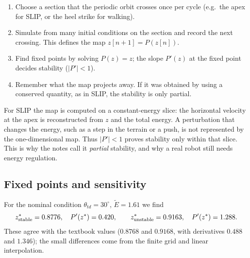 \documentclass[11pt]{article}
\begin{document}
\begin{recipe}[breakable=false,title={How to build and read a Poincar\'e map}]
\begin{enumerate}[leftmargin=1.4em,itemsep=2pt]
  \item Choose a section that the periodic orbit crosses once per cycle
        (e.g.\ the apex for SLIP, or the heel strike for walking).
  \item Simulate from many initial conditions on the section and record the
        next crossing.  This defines the map $z[n+1]=P(z[n])$.
  \item Find fixed points by solving $P(z)=z$; the slope $P'(z)$ at the fixed
        point decides stability ($|P'|<1$).
  \item Remember what the map projects away.  If it was obtained by using a
        conserved quantity, as in SLIP, the stability is only partial.
\end{enumerate}
\end{recipe}

\begin{pitfall}[breakable=false,title={A stable apex map is not full stability}]
For SLIP the map is computed on a constant-energy slice: the horizontal
velocity at the apex is reconstructed from $z$ and the total energy.  A
perturbation that changes the energy, such as a step in the terrain or a push,
is not represented by the one-dimensional map.  Thus $|P'|<1$ proves
stability only within that slice.  This is why the notes call it
\emph{partial} stability, and why a real robot still needs energy regulation.
\end{pitfall}

\subsection{Fixed points and sensitivity}

For the nominal condition $\theta_{td}=30^\circ$, $\tilde E=1.61$ we find
\begin{equation}
z^*_{\rm stable}=0.8776,\quad P'(z^*)=0.420,
\qquad
z^*_{\rm unstable}=0.9163,\quad P'(z^*)=1.288 .
\end{equation}
These agree with the textbook values ($0.8768$ and $0.9168$, with derivatives
$0.488$ and $1.346$); the small differences come from the finite grid and
linear interpolation.
\end{document}

